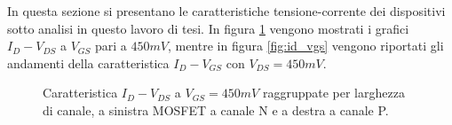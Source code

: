 In questa sezione si presentano le caratteristiche tensione-corrente dei dispositivi sotto analisi in questo lavoro di tesi.
In figura \ref{fig:id_vds} vengono mostrati i grafici $I_{D} - V_{DS}$ a $V_{GS}$ pari a $450mV$, mentre in figura \ref{fig:id_vgs} vengono riportati gli andamenti della caratteristica $I_D - V_{GS}$ con $V_{DS} = 450mV$.


\begin{figure}[ht]
    \centering
  
    \caption[Caratteristica $I_D - V_{DS}$]{Caratteristica $I_D - V_{DS}$ a $V_{GS} = 450mV$ raggruppate per larghezza di canale, a sinistra MOSFET a canale N e a destra a canale P.}
    \label{fig:id_vds}
  \end{figure}



